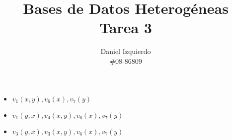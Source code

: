 \documentclass[10pt]{article}
\begin{document}

\title{Bases de Datos Heterogéneas \\ Tarea 3}
\author{Daniel Izquierdo \\ \#08-86809}

\maketitle

\section{}

\begin{itemize}
 \item $v_1(x,y),v_6(x),v_7(y)$
 \item $v_1(y,x),v_4(x,y),v_6(x),v_7(y)$
 \item $v_3(y,x),v_3(x,y),v_6(x),v_7(y)$
\end{itemize}


\section{}
\end{document}
